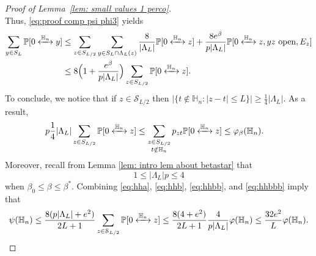 \documentclass[11pt,a4paper]{article}
\numberwithin{equation}{section}
\theoremstyle{plain}
\theoremstyle{definition}
\newcommand\bfC{\mathbf{C}}
\newcommand{\connect}{\xleftrightarrow}
\begin{document}
\begin{proof}[Proof of Lemma~\textup{\ref{lem: small values 1 perco}}]
\begin{equation}
\end{equation}
Thus, \eqref{eq:proof comp psi phi3} yields
\begin{align}\notag
\sum_{y\in S_L}\mathbb P[0\connect{\mathbb H_n\:}y]&\le \sum_{z\in S_{L/2}}\sum_{y\in S_L\cap \Lambda_L(z)}\frac{8}{|\Lambda_L|}\mathbb P[0\connect{\mathbb H_n\:}z]+ \frac{8e^\beta}{p|\Lambda_L|}\mathbb P[0\connect{\mathbb H_n\:}z,yz\text{ open},E_z]\\
&\le 8\Big(1+\frac{e^\beta}{p|\Lambda_L|}\Big)\sum_{z\in S_{L/2}}\mathbb P[0\connect{\mathbb H_n\:}z].\label{eq:hhb}
\end{align}
To conclude, we notice that if $z\in \mathcal S_{L/2}$ then $|\{t\notin \mathbb H_n: |z-t|\leq L\}|\geq \tfrac{1}{4}|\Lambda_L|$. As a result,
\begin{align}\label{eq:hhbb}
p\frac14|\Lambda_L|\sum_{z\in S_{L/2}}\mathbb P[0\connect{\mathbb H_n\:}z]&\le \sum_{\substack{z\in S_{L/2}\\t\notin \mathbb H_n}}p_{zt}\mathbb P[0\connect{\mathbb H_n\:}z]\le\varphi_\beta(\mathbb H_n).
\end{align}
Moreover, recall from Lemma \ref{lem: intro lem about betastar} that
\begin{equation}\label{eq:hhbbb}
1\leq|\Lambda_L|p\leq 4
\end{equation}
when $\beta_0\leq \beta\le \beta^*$. Combining \eqref{eq:hha}, \eqref{eq:hhb}, \eqref{eq:hhbb}, and \eqref{eq:hhbbb} imply that 
\begin{equation}
	\psi(\mathbb H_n)\leq \frac{8(p |\Lambda_L|+e^2)}{2L+1}\sum_{z\in \mathcal S_{L/2}}\mathbb P[0\connect{\mathbb H_n\:}z]\leq \frac{8(4+e^2)}{2L+1}\frac{4}{p |\Lambda_L|}\varphi(\mathbb H_n)\leq \frac{32e^2}{L}\varphi(\mathbb H_n).
\end{equation}
%
\end{proof}
\end{document}
